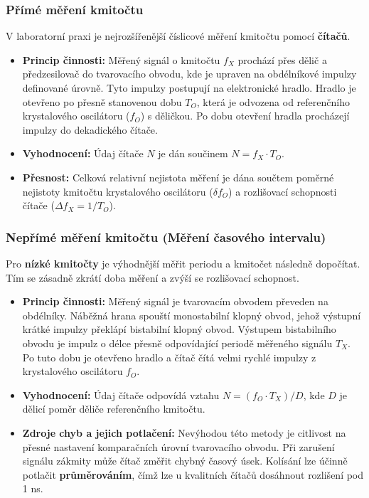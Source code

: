     \subsubsection{Přímé měření kmitočtu}
        V laboratorní praxi je nejrozšířenější číslicové měření kmitočtu pomocí \textbf{čítačů}.
        \begin{itemize}
            \item \textbf{Princip činnosti:} Měřený signál o kmitočtu $f_X$ prochází přes dělič a předzesilovač do tvarovacího obvodu, kde je upraven na obdélníkové impulzy definované úrovně. Tyto impulzy postupují na elektronické hradlo. Hradlo je otevřeno po přesně stanovenou dobu $T_O$, která je odvozena od referenčního krystalového oscilátoru ($f_O$) s děličkou. Po dobu otevření hradla procházejí impulzy do dekadického čítače.
            \item \textbf{Vyhodnocení:} Údaj čítače $N$ je dán součinem $N = f_X \cdot T_O$.
            \item \textbf{Přesnost:} Celková relativní nejistota měření je dána součtem poměrné nejistoty kmitočtu krystalového oscilátoru ($\delta f_O$) a rozlišovací schopnosti čítače ($\Delta f_X = 1/T_O$).
        \end{itemize}
    \subsubsection{Nepřímé měření kmitočtu (Měření časového intervalu)}
        Pro \textbf{nízké kmitočty} je výhodnější měřit periodu a kmitočet následně dopočítat. Tím se zásadně zkrátí doba měření a zvýší se rozlišovací schopnost.
        
        \begin{itemize}
            \item \textbf{Princip činnosti:} Měřený signál je tvarovacím obvodem převeden na obdélníky. Náběžná hrana spouští monostabilní klopný obvod, jehož výstupní krátké impulzy překlápí bistabilní klopný obvod. Výstupem bistabilního obvodu je impulz o délce přesně odpovídající periodě měřeného signálu $T_X$. Po tuto dobu je otevřeno hradlo a čítač čítá velmi rychlé impulzy z krystalového oscilátoru $f_O$.
            \item \textbf{Vyhodnocení:} Údaj čítače odpovídá vztahu $N = (f_O \cdot T_X)/D$, kde $D$ je dělicí poměr děliče referenčního kmitočtu.
            \item \textbf{Zdroje chyb a jejich potlačení:} Nevýhodou této metody je citlivost na přesné nastavení komparačních úrovní tvarovacího obvodu. Při zarušení signálu zákmity může čítač změřit chybný časový úsek. Kolísání lze účinně potlačit \textbf{průměrováním}, čímž lze u kvalitních čítačů dosáhnout rozlišení pod 1 ns.
        \end{itemize}
